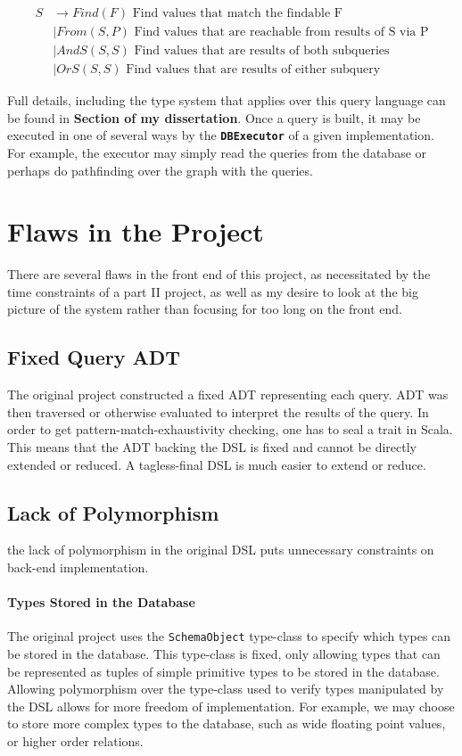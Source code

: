 \documentclass{report}
\newcommand \2[0]{\textbf{2}}
\newcommand \3[0]{\textbf{3}}
\newcommand{\todo}[1]{\textbf{#1}}
\begin{document}
    \begin{equation}
        \label{SDefinition}
        \begin{split}
        S & \rightarrow Find(F) \mbox{ Find values that match the findable F}\\
        &\mid From(S, P) \mbox{ Find values that are reachable from results of S via P}\\
        &\mid AndS(S, S) \mbox{ Find values that are results of both subqueries}\\
        &\mid OrS(S, S) \mbox{ Find values that are results of either subquery}
        \end{split}
    \end{equation} 

Full details, including the type system that applies over this query language can be found in \todo{Section of my dissertation}. Once a query is built, it may be executed in one of several ways by the \texttt{\todo{DBExecutor}} of a given implementation. For example, the executor may simply read the queries from the database or perhaps do pathfinding over the graph with the queries.
\section{Flaws in the Project}
There are several flaws in the front end of this project, as necessitated by the time constraints of a part II project, as well as my desire to look at the big picture of the system rather than focusing for too long on the front end.
\subsection{Fixed Query ADT}
The original project constructed a fixed ADT representing each query. ADT was then traversed or otherwise evaluated to interpret the results of the query. In order to get pattern-match-exhaustivity checking, one has to seal a trait in Scala. This means that the ADT backing the DSL is fixed and cannot be directly extended or reduced. A tagless-final DSL is much easier to extend or reduce.

\subsection{Lack of Polymorphism}
the lack of polymorphism in the original DSL puts unnecessary constraints on back-end implementation.
\paragraph{Types Stored in the Database}
The original project uses the \texttt{SchemaObject} type-class to specify which types can be stored in the database. This type-class is fixed, only allowing types that can be represented as tuples of simple primitive types to be stored in the database. Allowing polymorphism over the type-class used to verify types manipulated by the DSL allows for more freedom of implementation. For example, we may choose to store more complex types to the database, such as wide floating point values, or higher order relations.
\end{document}
